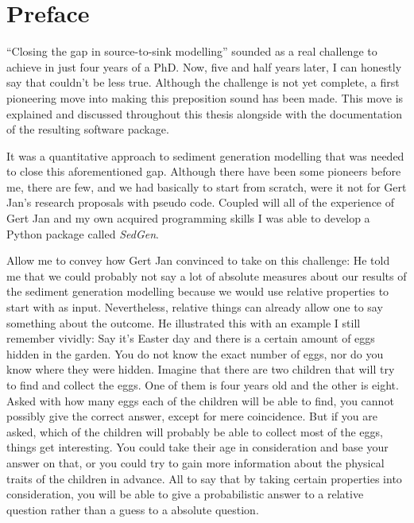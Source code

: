 \chapter*{Preface}\label{ch:preface}

``Closing the gap in source-to-sink modelling'' sounded as a real challenge to achieve in just four years of a PhD. %
Now, five and half years later, I can honestly say that couldn't be less true. %
Although the challenge is not yet complete, a first pioneering move into making this preposition sound has been made. %
This move is explained and discussed throughout this thesis alongside with the documentation of the resulting software package. %

It was a quantitative approach to sediment generation modelling that was needed to close this aforementioned gap. %
Although there have been some pioneers before me, there are few, and we had basically to start from scratch, were it not for Gert Jan's research proposals with pseudo code. %
Coupled will all of the experience of Gert Jan and my own acquired programming skills I was able to develop a Python package called \textit{SedGen}. %

Allow me to convey how Gert Jan convinced to take on this challenge:
He told me that we could probably not say a lot of absolute measures about our results of the sediment generation modelling because we would use relative properties to start with as input. %
Nevertheless, relative things can already allow one to say something about the outcome. %
He illustrated this with an example I still remember vividly: Say it's Easter day and there is a certain amount of eggs hidden in the garden. %
You do not know the exact number of eggs, nor do you know where they were hidden. %
Imagine that there are two children that will try to find and collect the eggs. %
One of them is four years old and the other is eight. %
Asked with how many eggs each of the children will be able to find, you cannot possibly give the correct answer, except for mere coincidence. %
But if you are asked, which of the children will probably be able to collect most of the eggs, things get interesting. %
You could take their age in consideration and base your answer on that, or you could try to gain more information about the physical traits of the children in advance. %
All to say that by taking certain properties into consideration, you will be able to give a probabilistic answer to a relative question rather than a guess to a absolute question. %

